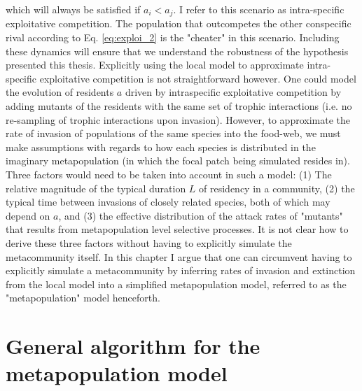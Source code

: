 \documentclass[a4paper]{report}
\begin{document}
{ which will always be satisfied if $a_i<a_j$. I refer to this scenario as intra-specific exploitative competition. The population that outcompetes the other conspecific rival according to Eq. \eqref{eq:exploi_2} is the "cheater" in this scenario. Including these dynamics will ensure that we understand the robustness of the hypothesis presented this thesis. Explicitly using the local model to approximate intra-specific exploitative competition is not straightforward however. One could model the evolution of residents $a$ driven by intraspecific exploitative competition by adding mutants of the residents with the same set of trophic interactions (i.e. no re-sampling of trophic interactions upon invasion). However, to approximate the rate of invasion of populations of the same species into the food-web, we must make assumptions with regards to how each species is distributed in the imaginary metapopulation (in which the focal patch being simulated resides in). Three factors would need to be taken into account in such a model: (1) The relative magnitude of the typical duration $L$ of residency in a community, (2) the typical time between invasions of closely related species, both of which may depend on $a$, and (3) the effective distribution of the attack rates of "mutants" that results from metapopulation level selective processes. It is not clear how to derive these three factors without having to explicitly simulate the metacommunity itself. In this chapter I argue that one can circumvent having to explicitly simulate a metacommunity by inferring rates of invasion and extinction from the local model into a simplified metapopulation model, referred to as the "metapopulation" model henceforth.
 
 \section{General algorithm for the metapopulation model}
 
}
\end{document}
